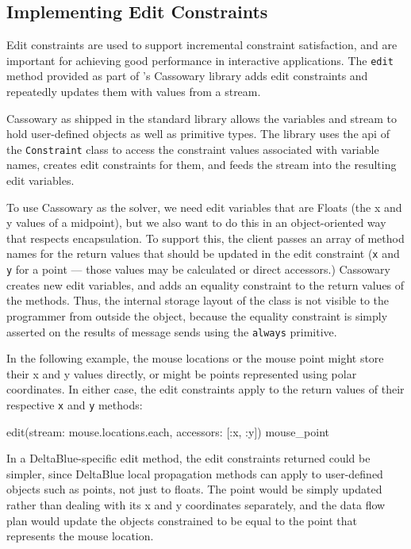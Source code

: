 \subsection{Implementing Edit Constraints}
\label{sec:implementing-edit-constraints}
Edit constraints are used to support incremental constraint
satisfaction, and are important for achieving good performance in
interactive applications.  The \lstinline{edit} method provided as
part of \toolname's Cassowary library adds edit constraints and
repeatedly updates them with values from a stream.

Cassowary as shipped in the \toolname standard library allows the
variables and stream to hold user-defined objects as well as primitive
types. The library uses the \ac{api} of the \lstinline{Constraint}
class to access the constraint values associated with variable names,
creates edit constraints for them, and feeds the stream into the
resulting edit variables.

To use Cassowary as the solver, we need edit variables that are Floats
(\eg the x and y values of a midpoint), but we also want to do this in
an object-oriented way that respects encapsulation. To support this,
the client passes an array of method names for the return values that
should be updated in the edit constraint (\eg \lstinline{x} and
\lstinline{y} for a point --- those values may be calculated or direct
accessors.)  Cassowary creates new edit variables, and adds an
equality constraint to the return values of the methods. Thus, the
internal storage layout of the class is not visible to the programmer
from outside the object, because the
equality constraint is simply asserted on the results of message sends
using the \lstinline{always} primitive.

In the following example, the mouse locations or the mouse point might
store their x and y values directly, or might be points represented
using polar coordinates.  In either case, the edit constraints apply
to the return values of their respective \lstinline{x} and \lstinline{y}
methods:
\begin{code}[numbers=none]
edit(stream: mouse.locations.each, accessors: [:x, :y]) { mouse_point }
\end{code}

In a DeltaBlue-specific edit method, the edit constraints returned
could be simpler, since DeltaBlue local propagation methods can apply
to user-defined objects such as points, not just to floats.
The point would be simply updated rather than
dealing with its x and y coordinates separately, and the data flow
plan would update the objects constrained to be equal to the point
that represents the mouse location.

